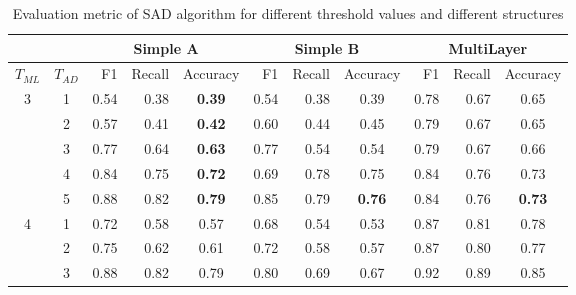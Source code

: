 \documentclass[12pt]{article}
\begin{document}
    \begin{table}[H]
        \centering
        \label{table3}
        \caption{Evaluation metric of SAD algorithm for different threshold values and different structures}
        \scriptsize
        \begin{tabular}{rrrrrrrrrrr}
            \hline
            &&\multicolumn{3}{c}{Simple A} &  \multicolumn{3}{c}{Simple B} &  \multicolumn{3}{c}{MultiLayer} \\
            \hline
            \multicolumn{1}{c}{$T_{ML}$} & \multicolumn{1}{c}{$T_{AD}$} & F1 & Recall & \multicolumn{1}{c}{Accuracy}  & F1 & Recall & \multicolumn{1}{c}{Accuracy}  & F1 & Recall & \multicolumn{1}{c}{Accuracy}\\
            \hline
            \multicolumn{1}{c}{\multirow{5}{*}{3}} & \multicolumn{1}{c}{1}& 0.54 & 0.38 & \multicolumn{1}{c}{\textbf{0.39}} & 0.54 & 0.38 & \multicolumn{1}{c}{0.39}  & 0.78 & 0.67 & \multicolumn{1}{c}{0.65} \\
            \multicolumn{1}{c}{} & \multicolumn{1}{c}{2}& 0.57 & 0.41 & \multicolumn{1}{c}{\textbf{0.42}} & 0.60 & 0.44 & \multicolumn{1}{c}{0.45} & 0.79 & 0.67 & \multicolumn{1}{c}{0.65} \\
            \multicolumn{1}{c}{} & \multicolumn{1}{c}{3}& 0.77 & 0.64 & \multicolumn{1}{c}{\textbf{0.63}} & 0.77 & 0.54 & \multicolumn{1}{c}{0.54} & 0.79 & 0.67 & \multicolumn{1}{c}{0.66}\\
            \multicolumn{1}{c}{} & \multicolumn{1}{c}{4}& 0.84 & 0.75 & \multicolumn{1}{c}{\textbf{0.72}} & 0.69 & 0.78 & \multicolumn{1}{c}{0.75} & 0.84 & 0.76 & \multicolumn{1}{c}{0.73} \\
            \multicolumn{1}{c}{} & \multicolumn{1}{c}{5}& 0.88 & 0.82 & \multicolumn{1}{c}{\textbf{0.79}} & 0.85 & 0.79 & \multicolumn{1}{c}{\textbf{0.76}} & 0.84 & 0.76 & \multicolumn{1}{c}{\textbf{0.73}} \\
            \hline
            \multicolumn{1}{c}{\multirow{5}{*}{4}} & \multicolumn{1}{c}{1}& 0.72 & 0.58 & \multicolumn{1}{c}{0.57}& 0.68 & 0.54 & \multicolumn{1}{c}{0.53}& 0.87 & 0.81 & \multicolumn{1}{c}{0.78} \\
            \multicolumn{1}{c}{} & \multicolumn{1}{c}{2}& 0.75 & 0.62 & \multicolumn{1}{c}{0.61} & 0.72 & 0.58 & \multicolumn{1}{c}{0.57} & 0.87 & 0.80 & \multicolumn{1}{c}{0.77}   \\
            \multicolumn{1}{c}{} & \multicolumn{1}{c}{3}& 0.88 & 0.82 & \multicolumn{1}{c}{0.79} & 0.80 & 0.69 & \multicolumn{1}{c}{0.67} & 0.92 & 0.89 & \multicolumn{1}{c}{0.85}   \\

\end{tabular}
\end{table}
\end{document}
